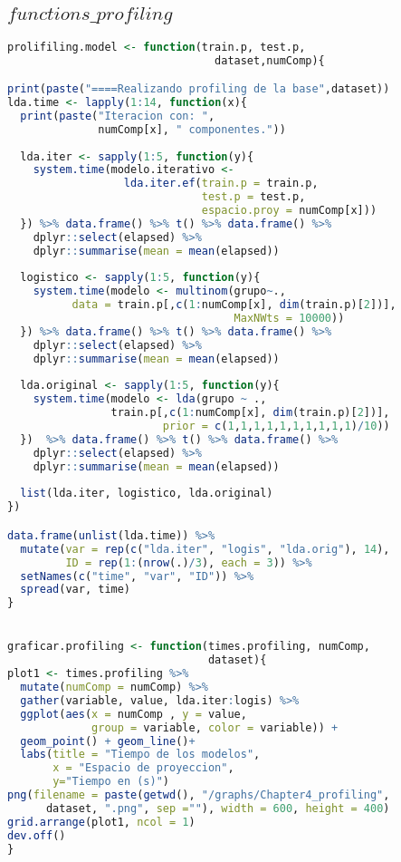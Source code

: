 \subsection{$functions\_profiling$}
\begin{lstlisting}[language=R, basicstyle=\small]
prolifiling.model <- function(train.p, test.p, 
                                dataset,numComp){

print(paste("====Realizando profiling de la base",dataset))
lda.time <- lapply(1:14, function(x){
  print(paste("Iteracion con: ", 
              numComp[x], " componentes."))
  
  lda.iter <- sapply(1:5, function(y){
    system.time(modelo.iterativo <- 
                  lda.iter.ef(train.p = train.p, 
                              test.p = test.p, 
                              espacio.proy = numComp[x]))
  }) %>% data.frame() %>% t() %>% data.frame() %>% 
    dplyr::select(elapsed) %>% 
    dplyr::summarise(mean = mean(elapsed))
  
  logistico <- sapply(1:5, function(y){
    system.time(modelo <- multinom(grupo~., 
          data = train.p[,c(1:numComp[x], dim(train.p)[2])], 
                                   MaxNWts = 10000))
  }) %>% data.frame() %>% t() %>% data.frame() %>% 
    dplyr::select(elapsed) %>% 
    dplyr::summarise(mean = mean(elapsed))
  
  lda.original <- sapply(1:5, function(y){
    system.time(modelo <- lda(grupo ~ .,
                train.p[,c(1:numComp[x], dim(train.p)[2])], 
                        prior = c(1,1,1,1,1,1,1,1,1,1)/10))
  })  %>% data.frame() %>% t() %>% data.frame() %>% 
    dplyr::select(elapsed) %>% 
    dplyr::summarise(mean = mean(elapsed))
  
  list(lda.iter, logistico, lda.original)
})

data.frame(unlist(lda.time)) %>% 
  mutate(var = rep(c("lda.iter", "logis", "lda.orig"), 14),
         ID = rep(1:(nrow(.)/3), each = 3)) %>% 
  setNames(c("time", "var", "ID")) %>% 
  spread(var, time)
}


graficar.profiling <- function(times.profiling, numComp,
                               dataset){
plot1 <- times.profiling %>% 
  mutate(numComp = numComp) %>% 
  gather(variable, value, lda.iter:logis) %>% 
  ggplot(aes(x = numComp , y = value,
             group = variable, color = variable)) +
  geom_point() + geom_line()+
  labs(title = "Tiempo de los modelos", 
       x = "Espacio de proyeccion", 
       y="Tiempo en (s)")
png(filename = paste(getwd(), "/graphs/Chapter4_profiling", 
      dataset, ".png", sep =""), width = 600, height = 400)
grid.arrange(plot1, ncol = 1)
dev.off()
}
\end{lstlisting}

